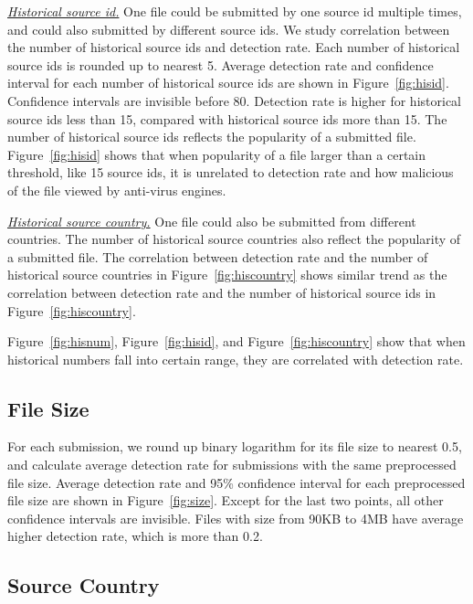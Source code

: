 {\textit{\underline{Historical source id.}}}
One file could be submitted by one source id multiple times, 
and could also submitted by different source ids. 
We study correlation between the number of historical source ids and detection rate. 
Each number of historical source ids is rounded up to nearest 5. 
Average detection rate and confidence interval for each number of historical source ids are shown in Figure~\ref{fig:hisid}. 
Confidence intervals are invisible before 80. 
Detection rate is higher for historical source ids less than 15, compared with historical source ids more than 15.
The number of historical source ids reflects the popularity of a submitted file.
Figure~\ref{fig:hisid} shows that when popularity of a file larger than a certain threshold, like 15 source ids, 
it is unrelated to detection rate and how malicious of the file viewed by anti-virus engines. 


{\textit{\underline{Historical source country.}}}
One file could also be submitted from different countries. 
The number of historical source countries also reflect the popularity of a submitted file. 
The correlation between detection rate and the number of historical source countries in 
Figure~\ref{fig:hiscountry} shows similar trend as the correlation between detection rate 
and the number of historical source ids in Figure~\ref{fig:hiscountry}. 

Figure~\ref{fig:hisnum}, Figure~\ref{fig:hisid}, and Figure~\ref{fig:hiscountry} show that 
when historical numbers fall into certain range, they are correlated with detection rate. 

\subsection{File Size}
\label{sec:size}

For each submission, we round up binary logarithm for its file size to nearest 0.5,
and calculate average detection rate for submissions with the same preprocessed file size.
Average detection rate and 95\% confidence interval for each preprocessed 
file size are shown in Figure~\ref{fig:size}.
Except for the last two points, all other confidence intervals are invisible.   
Files with size from 90KB to 4MB have average higher detection rate, which is more than 0.2. 

\subsection{Source Country}
\label{sec:country}

